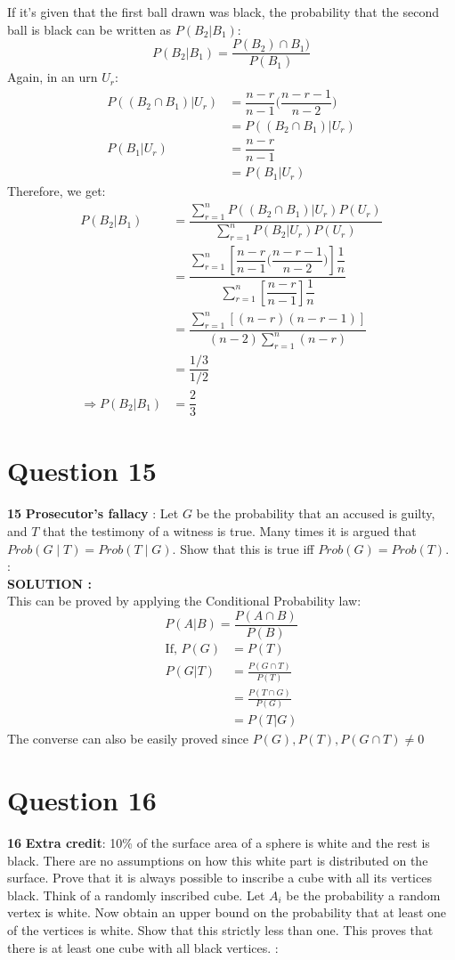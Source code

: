 \documentclass{article}
\begin{document}
If it's given that the first ball drawn was black, the probability that the second ball is black can be written as $P(B_2|B_1)$:
$$P(B_2|B_1) = \frac{P(B_2)\cap B_1)}{P(B_1)}$$
Again, in an urn $U_r$:
\begin{align*}
P((B_2\cap B_1)|U_r)&=\dfrac{n-r}{n-1}\Big(\dfrac{n-r-1}{n-2}\Big)\\
&=P((B_2\cap B_1)|U_r)\\
P(B_1|U_r)&=\dfrac{n-r}{n-1}\\
&=P(B_1|U_r)
\end{align*}
Therefore, we get:
\begin{align*}
    P(B_2|B_1)&=\dfrac{\sum^n_{r=1}P((B_2\cap B_1)|U_r)P(U_r)}{\sum^n_{r=1}P(B_2|U_r)P(U_r)}\\
    &=\dfrac{\sum^n_{r=1}\left[\dfrac{n-r}{n-1}\Big(\dfrac{n-r-1}{n-2}\Big)\right]\dfrac{1}{n}}{\sum^n_{r=1}\left[\dfrac{n-r}{n-1}\right]\dfrac{1}{n}}\\
    &=\dfrac{\sum^n_{r=1}\left[(n-r)(n-r-1)\right]}{(n-2)\sum^n_{r=1}(n-r)}\\
    &=\dfrac{1/3}{1/2}\\
  \Rightarrow P(B_2|B_1)&=\dfrac{2}{3}
\end{align*}


\section{Question 15}
\label{Q15}
\textbf{15} \textbf{Prosecutor’s fallacy} : Let $G$ be the probability that an accused is guilty, and $T$ that the testimony of a witness is true. Many times it is argued that $Prob (G \mid T) = Prob (T \mid G)$. Show that this is true iff $Prob (G) = Prob (T).$ : \\ 

\hspace{1em} \large{\textbf{SOLUTION :}} \\
    This can be proved by applying the Conditional Probability law:
    $$P(A|B) = \frac{P(A\cap B)}{P(B)}$$
\begin{align*}
    \text{If, } P(G) &= P(T)\\
    P(G|T)&=\frac{P(G\cap T)}{P(T)}\\
    &=\frac{P(T\cap G)}{P(G)}\\
    &=P(T|G)
\end{align*}
The converse can also be easily proved since  $P(G),P(T),P(G\cap T)\neq0$
\section{Question 16}
\label{Q16}
\textbf{16} \textbf{Extra credit}: 10\% of the surface area of a sphere is white and the rest is black. There are no assumptions on how this white part is distributed on the surface. Prove that it is always possible to inscribe a cube with all its vertices black. Think of a randomly inscribed cube. Let $A_i$ be the probability a random vertex is white. Now obtain an upper bound on the probability that at least one of the vertices is white. Show that this strictly less than one. This proves that there is at least one cube with all black vertices.
 : \\
\end{document}
